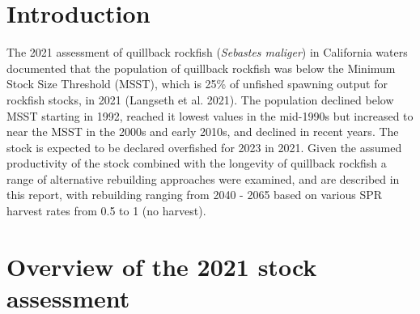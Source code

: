 \documentclass[11pt,
  english,
  letterpaper,
]{article}
\begin{document}
\leavevmode\tagmcend\tagstructend\par

\pagebreak
\setlength{\parskip}{5mm plus1mm minus1mm}
\setcounter{page}{1}
\renewcommand{\thefigure}{\arabic{figure}}
\renewcommand{\thetable}{\arabic{table}}
\setcounter{table}{0}
\setcounter{figure}{0}

\setlength\parskip{0.2em plus 0.1em minus 0.2em}


\hypertarget{introduction}{%
\section{Introduction}\label{introduction}}

\leavevmode\tagmcend\tagstructend


The 2021 assessment of quillback rockfish (\emph{Sebastes maliger}) in California waters documented that the population of quillback rockfish was below the Minimum Stock Size Threshold (MSST), which is 25\% of unfished spawning output for rockfish stocks, in 2021 {(Langseth et al. 2021)\leavevmode\tagmcend\tagstructend}. The population declined below MSST starting in 1992, reached it lowest values in the mid-1990s but increased to near the MSST in the 2000s and early 2010s, and declined in recent years. The stock is expected to be declared overfished for 2023 in 2021. Given the assumed productivity of the stock combined with the longevity of quillback rockfish a range of alternative rebuilding approaches were examined, and are described in this report, with rebuilding ranging from 2040 - 2065 based on various SPR harvest rates from 0.5 to 1 (no harvest).

\leavevmode\tagmcend\tagstructend\par


\hypertarget{overview-of-the-2021-stock-assessment}{%
\section{Overview of the 2021 stock assessment}\label{overview-of-the-2021-stock-assessment}}

\leavevmode\tagmcend\tagstructend

\end{document}
